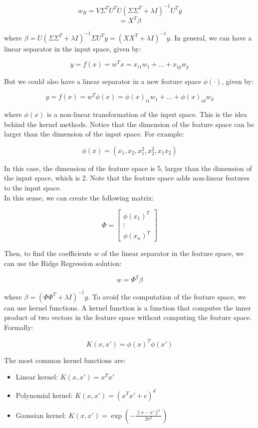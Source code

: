 $$w_R = V \Sigma^T U^T U (\Sigma \Sigma^T + \lambda I)^{-1} U^T y$$
$$= X^T \beta$$

where $\beta = U (\Sigma \Sigma^T + \lambda I)^{-1} \Sigma U^T y = (X X^T + \lambda I)^{-1} y$. In general, we can have a linear 
separator in the input space, given by:

$$y = f(x) = w^T x = x_{i1} w_1 + \ldots + x_{ip} w_p$$

But we could also have a linear separator in a new feature space $\phi(\cdot)$, given by:

$$y = f(x) = w^T \phi(x) = \phi(x)_{i1} w_1 + \ldots + \phi(x)_{id} w_d$$

where $\phi(x)$ is a non-linear transformation of the input space. This is the idea behind the kernel methods.
Notice that the dimension of the feature space can be larger than the dimension of the input space. For example:

$$\phi(x) = (x_1, x_2, x_1^2, x_2^2, x_1 x_2)$$

In this case, the dimension of the feature space is 5, larger than the dimension of the input space,
which is 2. Note that the feature space adds non-linear features to the input space.\\

In this sense, we can create the following matrix:

$$\Phi = \begin{bmatrix}
    \phi(x_1)^T \\
    \vdots \\
    \phi(x_n)^T
\end{bmatrix}$$

Then, to find the coefficients $w$ of the linear separator in the feature space, we can use the Ridge Regression
solution:

$$w = \Phi^T \beta$$

where $\beta = (\Phi \Phi^T + \lambda I)^{-1} y$. To avoid the computation of the feature space, we can use
kernel functions. A kernel function is a function that computes the inner product of two vectors in the feature
space without computing the feature space. Formally:

\begin{equation}
    K(x, x') = \phi(x)^T \phi(x')
\end{equation}

The most common kernel functions are:

\begin{itemize}
    \item Linear kernel: $K(x, x') = x^T x'$
    \item Polynomial kernel: $K(x, x') = (x^T x' + c)^d$
    \item Gaussian kernel: $K(x, x') = \exp(-\frac{\|x - x'\|^2}{2 \sigma^2})$
\end{itemize}

